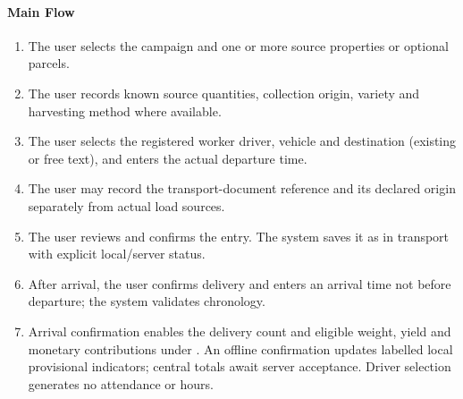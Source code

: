 \paragraph{Main Flow}
\begin{enumerate}
\item The user selects the campaign and one or more source properties or optional parcels.
\item The user records known source quantities, collection origin, variety and harvesting method where available.
\item The user selects the registered worker driver, vehicle and destination (existing or free text), and enters the actual departure time.
\item The user may record the transport-document reference and its declared origin separately from actual load sources.
\item The user reviews and confirms the entry. The system saves it as in transport with explicit local/server status.
\item After arrival, the user confirms delivery and enters an arrival time not before departure; the system validates chronology.
\item Arrival confirmation enables the delivery count and eligible weight, yield and monetary contributions under . An offline confirmation updates labelled local provisional indicators; central totals await server acceptance. Driver selection generates no attendance or hours.
\end{enumerate}

